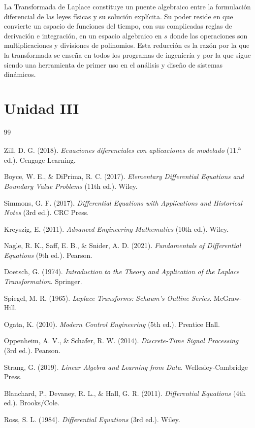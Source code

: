 \documentclass[12pt,letterpaper]{report}
\numberwithin{equation}{chapter}
\numberwithin{figure}{chapter}
\numberwithin{table}{chapter}
\begin{document}
La Transformada de Laplace constituye un puente algebraico entre la formulación diferencial de las leyes físicas y su solución explícita. Su poder reside en que convierte un espacio de funciones del tiempo, con sus complicadas reglas de derivación e integración, en un espacio algebraico en $s$ donde las operaciones son multiplicaciones y divisiones de polinomios. Esta reducción es la razón por la que la transformada se enseña en todos los programas de ingeniería y por la que sigue siendo una herramienta de primer uso en el análisis y diseño de sistemas dinámicos.

\chapter{Unidad III}

\begin{thebibliography}{99}

Zill, D. G. (2018). \textit{Ecuaciones diferenciales con aplicaciones de modelado} (11.\textsuperscript{a} ed.). Cengage Learning.

Boyce, W. E., \& DiPrima, R. C. (2017). \textit{Elementary Differential Equations and Boundary Value Problems} (11th ed.). Wiley.

Simmons, G. F. (2017). \textit{Differential Equations with Applications and Historical Notes} (3rd ed.). CRC Press.

Kreyszig, E. (2011). \textit{Advanced Engineering Mathematics} (10th ed.). Wiley.

Nagle, R. K., Saff, E. B., \& Snider, A. D. (2021). \textit{Fundamentals of Differential Equations} (9th ed.). Pearson.

Doetsch, G. (1974). \textit{Introduction to the Theory and Application of the Laplace Transformation}. Springer.

Spiegel, M. R. (1965). \textit{Laplace Transforms: Schaum's Outline Series}. McGraw-Hill.

Ogata, K. (2010). \textit{Modern Control Engineering} (5th ed.). Prentice Hall.

Oppenheim, A. V., \& Schafer, R. W. (2014). \textit{Discrete-Time Signal Processing} (3rd ed.). Pearson.

Strang, G. (2019). \textit{Linear Algebra and Learning from Data}. Wellesley-Cambridge Press.

Blanchard, P., Devaney, R. L., \& Hall, G. R. (2011). \textit{Differential Equations} (4th ed.). Brooks/Cole.

Ross, S. L. (1984). \textit{Differential Equations} (3rd ed.). Wiley.


\end{thebibliography}
\end{document}
